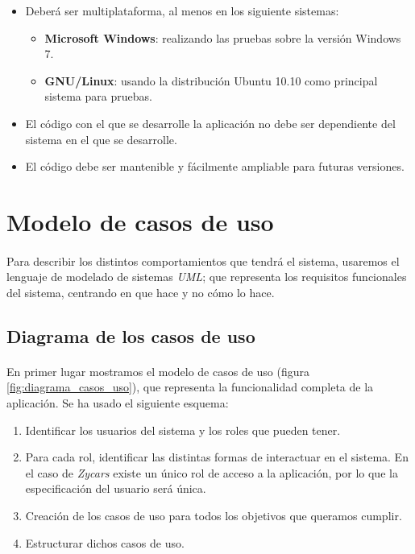 \begin{itemize}
    \item Deberá ser multiplataforma, al menos en los siguiente sistemas:
    \begin{itemize}
        \item \textbf{Microsoft Windows}: realizando las pruebas sobre la versión Windows 7.
        \item \textbf{GNU/Linux}: usando la distribución Ubuntu 10.10 como principal sistema para pruebas.
    \end{itemize}
    
    \item El código con el que se desarrolle la aplicación no debe ser
    dependiente del sistema en el que se desarrolle.
    
    \item El código debe ser mantenible y fácilmente ampliable para futuras versiones.
\end{itemize}

\section{Modelo de casos de uso}

\paragraph{}
Para describir los distintos comportamientos que tendrá el sistema, usaremos el lenguaje de modelado de sistemas \emph{UML}; que
representa los requisitos funcionales del sistema, centrando en que hace y no cómo lo hace.

\subsection{Diagrama de los casos de uso}

\paragraph{}
En primer lugar mostramos el modelo de casos de uso (figura \ref{fig:diagrama_casos_uso}), que representa la funcionalidad completa de la aplicación. Se ha usado el 
siguiente esquema:

\begin{enumerate}
    \item Identificar los usuarios del sistema y los roles que pueden tener.
    \item Para cada rol, identificar las distintas formas de interactuar en el sistema. En el caso de \emph{Zycars} existe
    un único rol de acceso a la aplicación, por lo que la especificación del usuario será única.
    \item Creación de los casos de uso para todos los objetivos que queramos cumplir.
    \item Estructurar dichos casos de uso.
\end{enumerate}

